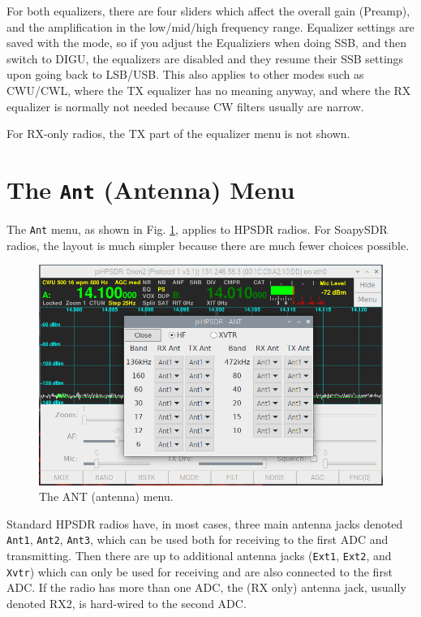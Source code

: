 \documentclass[12pt]{book}
\def\rett#1{\texttt{\color{red}#1}}
\def\bltt#1{\texttt{\color{blue}#1}}
\begin{document}
For both equalizers, there are four sliders which affect the
overall gain (Preamp), and the amplification in the low/mid/high
frequency range. Equalizer settings are saved with the mode, so
if you adjust the Equaliziers when doing SSB, and then switch to
DIGU, the equalizers are disabled and they resume their SSB
settings upon going back to LSB/USB. This also applies to other
modes such as CWU/CWL, where the TX equalizer has no meaning 
anyway, and where the RX equalizer is normally not needed because
CW filters usually are narrow.

For RX-only radios, the TX part of the equalizer menu is not shown.

\section{The \texttt{Ant} (Antenna) Menu}

The \bltt{Ant} menu, as shown in Fig. \ref{fig:ANTmenu}, 
applies to HPSDR radios. For SoapySDR radios, the layout
is much simpler because there are much fewer choices possible.

\begin{figure}[ht]
\center
\includegraphics[width=12cm]{ANTmenu.png}
\caption{The ANT (antenna) menu.}
\label{fig:ANTmenu}
\end{figure}
 
 Standard HPSDR radios have, in most cases, three main antenna jacks
 denoted \rett{Ant1}, \rett{Ant2}, \rett{Ant3}, which can be used both for receiving to 
 the first ADC and
 transmitting. Then there are up to additional antenna jacks (\rett{Ext1}, \rett{Ext2}, 
 and \rett{Xvtr}) which can only be used for receiving and are also connected
 to the first ADC. If the radio has more than one ADC, the (RX only)
 antenna jack, usually denoted RX2, is hard-wired to the second ADC.
 
\end{document}
